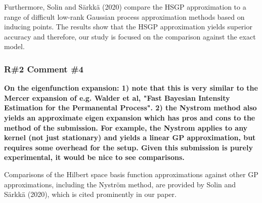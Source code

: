 \documentclass[11pt]{report}
\begin{document}
Furthermore, Solin and Särkkä (2020) compare the HSGP approximation to a range of difficult low-rank Gaussian process approximation methods based on inducing points. The results show that the HSGP approximation yields superior accuracy and therefore, our study is focused on the comparison against the exact model.


\subsubsection*{R\#2 Comment \#4}

\textbf{On the eigenfunction expansion: 1) note that this is very similar to the Mercer expansion of e.g. Walder et al, "Fast Bayesian Intensity Estimation for the Permanental Process". 2) the Nystrom method also yields an approximate eigen expansion which has pros and cons to the method of the submission. For example, the Nystrom applies to any kernel (not just stationary) and yields a linear GP approximation, but requires some overhead for the setup. Given this submission is purely experimental, it would be nice to see comparisons.} 

Comparisons of the Hilbert space basis function approximations against other GP approximations, including the Nyström method, are provided by Solin and Särkkä (2020), which is cited prominently in our paper.




\end{document}
